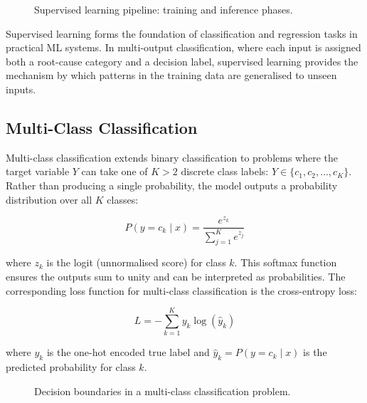 \documentclass[10pt,a4paper]{article}
\begin{document}
\begin{figure}[H]
    \centering
    \caption{Supervised learning pipeline: training and inference phases.}
    \label{fig:supervised-learning-pipeline}
\end{figure}

Supervised learning forms the foundation of classification and regression tasks in practical ML systems. In multi-output classification, where each input is assigned both a root-cause category and a decision label, supervised learning provides the mechanism by which patterns in the training data are generalised to unseen inputs.

\subsection{Multi-Class Classification}
\label{sec:multiclass-classification}

Multi-class classification extends binary classification to problems where the target variable $Y$ can take one of $K > 2$ discrete class labels: $Y \in \{c_1, c_2, \ldots, c_K\}$. Rather than producing a single probability, the model outputs a probability distribution over all $K$ classes:

\begin{equation}
P(y = c_k \mid x) = \frac{e^{z_k}}{\sum_{j=1}^{K} e^{z_j}}
\label{eq:softmax}
\end{equation}

where $z_k$ is the logit (unnormalised score) for class $k$. This softmax function ensures the outputs sum to unity and can be interpreted as probabilities. The corresponding loss function for multi-class classification is the cross-entropy loss:

\begin{equation}
L = -\sum_{k=1}^{K} y_k \log(\hat{y}_k)
\label{eq:ce-loss}
\end{equation}

where $y_k$ is the one-hot encoded true label and $\hat{y}_k = P(y = c_k \mid x)$ is the predicted probability for class $k$.

\begin{figure}[H]
    \centering
    \caption{Decision boundaries in a multi-class classification problem.}
    \label{fig:multiclass-decision-boundary}
\end{figure}
\end{document}
